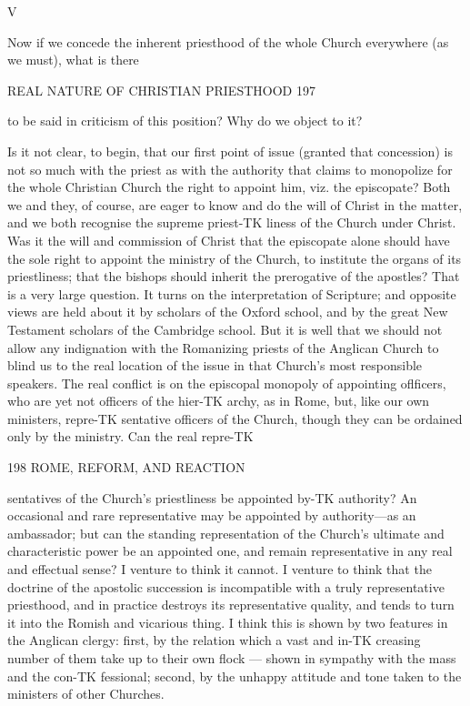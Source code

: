 \documentclass[12pt,a5paper,twoside]{book}
\begin{document}
{V 

Now if we concede the inherent priesthood of the 
whole Church everywhere (as we must), what is there 



REAL NATURE OF CHRISTIAN PRIESTHOOD 197 

to be said in criticism of this position? Why do 
we object to it? 

Is it not clear, to begin, that our first point of 
issue (granted that concession) is not so much with the 
priest as with the authority that claims to monopolize 
for the whole Christian Church the right to appoint 
him, viz. the episcopate? Both we and they, of 
course, are eager to know and do the will of Christ in 
the matter, and we both recognise the supreme priest-TK
liness of the Church under Christ. Was it the will 
and commission of Christ that the episcopate alone 
should have the sole right to appoint the ministry of 
the Church, to institute the organs of its priestliness; 
that the bishops should inherit the prerogative of the 
apostles? That is a very large question. It turns on 
the interpretation of Scripture; and opposite views 
are held about it by scholars of the Oxford school, 
and by the great New Testament scholars of the 
Cambridge school. But it is well that we should not 
allow any indignation with the Romanizing priests of 
the Anglican Church to blind us to the real location 
of the issue in that Church's most responsible speakers. 
The real conflict is on the episcopal monopoly of 
appointing oflficers, who are yet not officers of the hier-TK
archy, as in Rome, but, like our own ministers, repre-TK
sentative officers of the Church, though they can be 
ordained only by the ministry. Can the real repre-TK



198 ROME, REFORM, AND REACTION 

sentatives of the Church's priestliness be appointed by-TK
authority? An occasional and rare representative 
may be appointed by authority---as an ambassador; 
but can the standing representation of the Church's 
ultimate and characteristic power be an appointed one, 
and remain representative in any real and effectual 
sense? I venture to think it cannot. I venture to 
think that the doctrine of the apostolic succession is 
incompatible with a truly representative priesthood, 
and in practice destroys its representative quality, and 
tends to turn it into the Romish and vicarious thing. 
I think this is shown by two features in the Anglican 
clergy: first, by the relation which a vast and in-TK
creasing number of them take up to their own flock 
— shown in sympathy with the mass and the con-TK
fessional; second, by the unhappy attitude and tone 
taken to the ministers of other Churches. 

}
\end{document}
